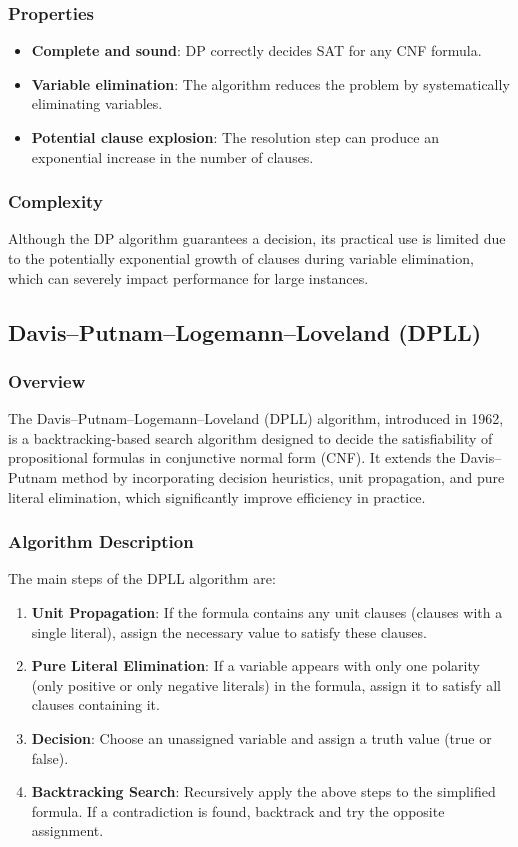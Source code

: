 \documentclass{article}
\begin{document}
\subsubsection{Properties}
\begin{itemize}
    \item \textbf{Complete and sound}: DP correctly decides SAT for any CNF formula.
    \item \textbf{Variable elimination}: The algorithm reduces the problem by systematically eliminating variables.
    \item \textbf{Potential clause explosion}: The resolution step can produce an exponential increase in the number of clauses.
\end{itemize}

\subsubsection{Complexity}
Although the DP algorithm guarantees a decision, its practical use is limited due to the potentially exponential growth of clauses during variable elimination, which can severely impact performance for large instances.

\subsection{Davis–Putnam–Logemann–Loveland (DPLL)}

\subsubsection{Overview}
The Davis–Putnam–Logemann–Loveland (DPLL) algorithm, introduced in 1962, is a backtracking-based search algorithm designed to decide the satisfiability of propositional formulas in conjunctive normal form (CNF). It extends the Davis–Putnam method by incorporating decision heuristics, unit propagation, and pure literal elimination, which significantly improve efficiency in practice.

\subsubsection{Algorithm Description}
The main steps of the DPLL algorithm are:
\begin{enumerate}
    \item \textbf{Unit Propagation}: If the formula contains any unit clauses (clauses with a single literal), assign the necessary value to satisfy these clauses.
    \item \textbf{Pure Literal Elimination}: If a variable appears with only one polarity (only positive or only negative literals) in the formula, assign it to satisfy all clauses containing it.
    \item \textbf{Decision}: Choose an unassigned variable and assign a truth value (true or false).
    \item \textbf{Backtracking Search}: Recursively apply the above steps to the simplified formula. If a contradiction is found, backtrack and try the opposite assignment.
\end{enumerate}
\end{document}

